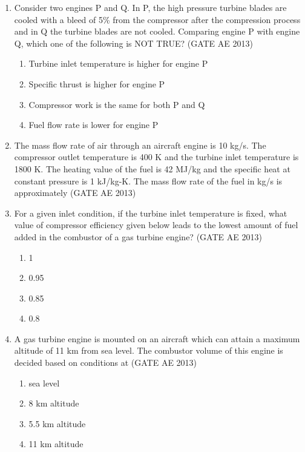 \documentclass[journal,12pt,onecolumn]{IEEEtran}
\theoremstyle{remark}
\begin{document}
\begin{flushleft}
\begin{enumerate}
\item Consider two engines P and Q. In P, the high pressure turbine blades are cooled with a bleed of 5\% from the compressor after the compression process and in Q the turbine blades are not cooled. Comparing engine P with engine Q, which one of the following is NOT TRUE? 
\hfill(GATE AE 2013)

\begin{enumerate}
    \item Turbine inlet temperature is higher for engine P  
    \item Specific thrust is higher for engine P  
    \item Compressor work is the same for both P and Q  
    \item Fuel flow rate is lower for engine P  
\end{enumerate}

\item The mass flow rate of air through an aircraft engine is 10 kg/s. The compressor outlet temperature is 400 K and the turbine inlet temperature is 1800 K. The heating value of the fuel is 42 MJ/kg and the specific heat at constant pressure is 1 kJ/kg-K. The mass flow rate of the fuel in kg/s is approximately \underline{\hspace{3cm}}
\hfill(GATE AE 2013)

\item For a given inlet condition, if the turbine inlet temperature is fixed, what value of compressor efficiency given below leads to the lowest amount of fuel added in the combustor of a gas turbine engine? 
\hfill(GATE AE 2013)

\begin{multicols}{2}
\begin{enumerate}
    \item 1  
    \item 0.95  
    \item 0.85  
    \item 0.8  
\end{enumerate}
\end{multicols}

\item A gas turbine engine is mounted on an aircraft which can attain a maximum altitude of 11 km from sea level. The combustor volume of this engine is decided based on conditions at \underline{\hspace{3cm}}
\hfill(GATE AE 2013)

\begin{multicols}{2}
\begin{enumerate}
    \item sea level  
    \item 8 km altitude  
    \item 5.5 km altitude  
    \item 11 km altitude  
\end{enumerate}
\end{multicols}


\end{enumerate}
\end{flushleft}
\end{document}
